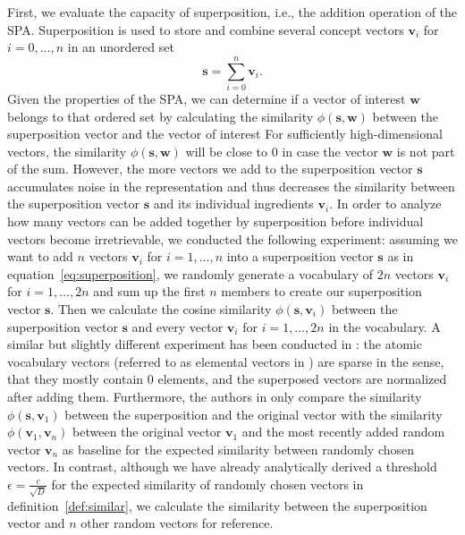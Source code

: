 First, we evaluate the capacity of superposition, i.e., the addition operation of the \ac{SPA}.
Superposition is used to store and combine several concept vectors $ \mathbf{v}_i$ for $i=0, \ldots, n$ in an unordered set
\begin{equation}
\label{eq:superposition}
\mathbf{s} = \sum\limits_{i=0}^{n} \mathbf{v}_{i}.
\end{equation}
Given the properties of the \ac{SPA}, we can determine if a vector of interest $\mathbf{w}$ belongs to that ordered set by calculating the similarity $\phi\left( \mathbf{s}, \mathbf{w}\right)$ between the superposition vector and the vector of interest
For sufficiently high-dimensional vectors, the similarity $\phi\left( \mathbf{s}, \mathbf{w}\right)$ will be close to \num{0} in case the vector $ \mathbf{w}$ is not part of the sum.
However, the more vectors we add to the superposition vector $ \mathbf{s}$ accumulates noise in the representation and thus decreases the similarity between the superposition vector $ \mathbf{s}$ and its individual ingredients $ \mathbf{v}_i$.
In order to analyze how many vectors can be added together by superposition before individual vectors become irretrievable, we conducted the following experiment: assuming we want to add $n$ vectors $ \mathbf{v}_i$ for $i=1, \ldots, n$ into a superposition vector $ \mathbf{s}$ as in equation~\eqref{eq:superposition}, we randomly generate a vocabulary of $2n$ vectors $ \mathbf{v}_i$ for $i=1, \ldots, 2n$ and sum up the first $n$ members to create our superposition vector $ \mathbf{s}$.
Then we calculate the cosine similarity $\phi\left(\mathbf{s}, \mathbf{v}_i\right)$ between the superposition vector $ \mathbf{s}$ and every vector $ \mathbf{v}_{i}$ for $i=1,\ldots, 2n$ in the vocabulary.
A similar but slightly different experiment has been conducted in \cite{Wahle2012}: the atomic vocabulary vectors (referred to as elemental vectors in \cite{Wahle2012}) are sparse in the sense, that they mostly contain \num{0} elements, and the superposed vectors are normalized after adding them.
Furthermore, the authors in \cite{Wahle2012} only compare the similarity $\phi\left(\mathbf{s}, \mathbf{v}_1\right)$ between the superposition and the original vector with the similarity $\phi\left(\mathbf{v}_1, \mathbf{v}_n\right)$ between the original vector $ \mathbf{v}_1$ and the most recently added random vector $ \mathbf{v}_{n}$ as baseline for the expected similarity between randomly chosen vectors.
In contrast, although we have already analytically derived a threshold $\epsilon= \tfrac{c}{\sqrt{D}}$ for the expected similarity of randomly chosen vectors in definition~\ref{def:similar}, we calculate the similarity between the superposition vector and $n$ other random vectors for reference.

